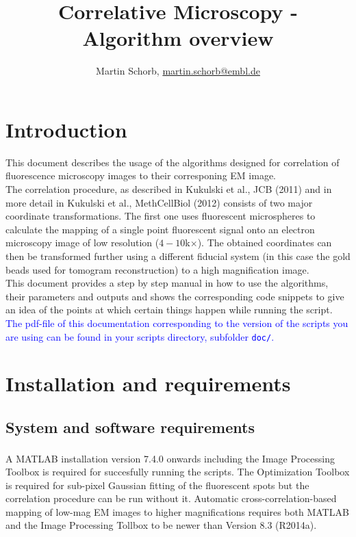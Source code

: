 \documentclass[10pt,a4paper,onepage,DIV12]{scrartcl}
\title{Correlative Microscopy - Algorithm overview}
\author{Martin Schorb, \href{mailto:martin.schorb@embl.de}{martin.schorb@embl.de}}
\begin{document}
\maketitle
\tableofcontents
 \newpage
\section{Introduction}
This document describes the usage of the algorithms designed for correlation of fluorescence microscopy images to their corresponing EM image.\\

The correlation procedure, as described in Kukulski et al., JCB (2011) and in more detail in Kukulski et al., MethCellBiol (2012) consists of two major coordinate transformations. The first one uses fluorescent microspheres to calculate the mapping of a single point fluorescent signal onto an electron microscopy image of low resolution ($4-10 $k$\times$). The obtained coordinates can then be transformed further using a different fiducial system (in this case the gold beads used for tomogram reconstruction) to a high magnification image.\\

This document provides a step by step manual in how to use the algorithms, their parameters and outputs and shows the corresponding code snippets to give an idea of the points at which certain things happen while running the script.\\

\textcolor{blue}{The pdf-file of this documentation corresponding to the version of the scripts you are using can be found in your scripts directory, subfolder \texttt{doc/}.}
\section{Installation and requirements}

\subsection{System and software requirements}A MATLAB\textsuperscript{\textregistered} 
installation version 7.4.0 onwards including the Image Processing Toolbox is required for succesfully running the scripts. The Optimization Toolbox is required for sub-pixel Gaussian fitting of the fluorescent spots but the correlation procedure can be run without it. Automatic cross-correlation-based mapping of low-mag EM images to higher magnifications requires both MATLAB and the Image Processing Tollbox to be newer than Version 8.3 (R2014a).
\end{document}
